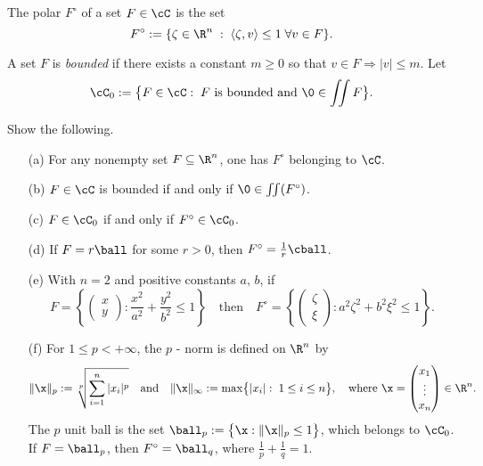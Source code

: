 \documentclass[12pt]{article}
\begin{document}
\begin{defn}
The polar $F^{\circ}$ of a set $F\in\cC$ is the set
\[
F^{\circ}:= \{\zeta\in \R^n\;:\;\langle \zeta,v\rangle\leq 1\;\forall
v\in F\}.
\]
\end{defn}

A set $F$ is {\em bounded} if there exists a constant $m\geq 0$ so that $v\in F\Rightarrow |v|\leq m$.  Let 
\[
\cC_{0}:=\bigl\{F\in \cC:\;F\text{ is bounded and }\0\in\iint{F}\bigr\}. 
\]

{\blue
\begin{exer}
Show the following.
\begin{itemize}
\item[(a)] For any nonempty set $F\subseteq\R^n$, one has $F^{\circ}$ belonging to $\cC$.
\item[(b)] $F\in \cC$ is bounded if and only if
 $\0\in\iint(F^{\circ})$.
\item[(c)] $F\in \cC_0$ if and only if
 $F^{\circ}\in\cC_0$.
\item[(d)]  If $F=r\ball$ for some $r>0$, then $F^{\circ}=\frac{1}{r}\cball$. 
\item[(e)]  With $n=2$ and positive constants $a,\,b$, if
\[
F=\left\{\begin{pmatrix} x \\ y\end{pmatrix}:\frac{x^2}{a^2}+\frac{y^2}{b^2}\leq 1\right\}
\quad\text{then}\quad F^{\circ}=\left\{\begin{pmatrix} \zeta \\ \xi\end{pmatrix}:{a^2}\zeta^2+{b^2}\xi^2\leq 1\right\}.
\]
\item[(f)] For $1\leq p< +\infty$, the $p$ - norm is defined on $\R^n$ by 
\[
\|\x\|_{p}:=\root{p}\of{\sum_{i=1}^n |x_i|^{p}} 
\quad\text{and}\quad
\|\x\|_{\infty}:=\max\bigl\{|x_i|:\;1\leq i\leq n\bigr\}, \quad\text{where }\x=\begin{pmatrix}x_1 \\ \vdots \\ x_n\end{pmatrix}\in\R^n.
\]
The $p$ unit ball is the set $\ball_p:=\bigl\{\x:\|\x\|_p\leq 1\bigr\}$, which belongs to $\cC_0$.  If $F=\ball_p$, then $F^{\circ}=\ball_q$, where $\frac{1}{p}+\frac{1}{q}=1$.
\end{itemize}
\end{exer}}
\end{document}
